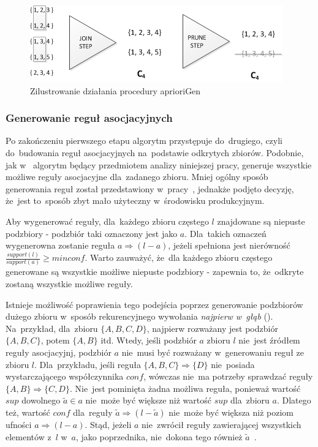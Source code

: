 \begin{figure}[ht]
\centering\includegraphics{figures/02/candidates_generation.png}
\caption{Zilustrowanie działania procedury aprioriGen}\label{rys:example_candidates}
\end{figure}

\subsubsection{Generowanie reguł asocjacyjnych}\label{sec:genrules}
Po zakończeniu pierwszego etapu algorytm przystępuje do~drugiego, czyli do~budowania reguł asocjacyjnych na~podstawie odkrytych zbiorów. Podobnie, jak w~\cite{Apriori:Main} algorytm będący przedmiotem analizy niniejszej pracy, generuje wszystkie możliwe reguły asocjacyjne dla~zadanego zbioru. Mniej ogólny sposób generowania reguł został przedstawiony w~pracy~\cite{Problem:Statement}, jednakże podjęto decyzję, że~jest to~sposób zbyt mało użyteczny w~środowisku produkcyjnym.

Aby wygenerować reguły, dla~każdego zbioru częstego $l$ znajdowane są niepuste podzbiory - podzbiór taki oznaczony jest jako $a$. Dla~takich oznaczeń wygenerowna zostanie reguła $a \Rightarrow (l-a)$, jeżeli spełniona jest nierówność $\frac{support(l)}{support(a)} \geq minconf$. Warto zauważyć, że~dla każdego zbioru częstego generowane są wszystkie możliwe niepuste podzbiory - zapewnia to, że~odkryte zostaną wszystkie możliwe reguły.

Istnieje możliwość poprawienia tego podejścia poprzez generowanie podzbiorów dużego zbioru w~sposób rekurencyjnego wywołania \emph{najpierw w~głąb} (). Na~przykład, dla~zbioru $\lbrace A, B, C, D \rbrace$, najpierw rozważany jest podzbiór $\lbrace A, B, C \rbrace$, potem $\lbrace A, B \rbrace$ itd. Wtedy, jeśli podzbiór $a$ zbioru $l$ nie~jest źródłem reguły asocjacyjnj, podzbiór $a$ nie~musi być rozważany w~generowaniu reguł ze zbioru $l$. Dla~przykładu, jeśli reguła $\lbrace A, B, C \rbrace \Rightarrow \lbrace D \rbrace$ nie~posiada wystarczającego współczynnika $conf$, wówczas nie~ma potrzeby sprawdzać reguły $\lbrace A, B \rbrace \Rightarrow \lbrace C, D \rbrace$. Nie~jest pominięta żadna możliwa reguła, ponieważ wartość $sup$ dowolnego $\tilde{a} \in a$ nie~może być większe niż wartość $sup$ dla~zbioru $a$. Dlatego też, wartość $conf$ dla~reguły $\tilde{a} \Rightarrow (l - \tilde{a})$ nie~może być większa niż poziom ufności $a \Rightarrow (l-a)$. Stąd, jeżeli $a$ nie~zwrócił reguły zawierającej wszystkich elementów z~$l$ w~$a$, jako poprzednika, nie~dokona tego również $\tilde{a}$~\cite{Apriori:Main}.

